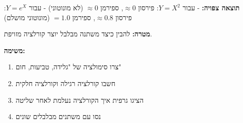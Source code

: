 \textbf{תוצאה צפויה:} 
- עבור $Y=X^2$: פירסון $\approx 0$, ספירמן $\approx 0$ (לא מונוטוני)
- עבור $Y=e^X$: פירסון $\approx 0.8$, ספירמן $= 1.0$ (מונוטוני מושלם)


\textbf{מטרה:} להבין כיצד משתנה מבלבל יוצר קורלציה מזויפת.

\textbf{משימה:}

\begin{enumerate}
\item צרו סימולציה של "גלידה, טביעות, חום"
\item חשבו קורלציה רגילה וקורלציה חלקית
\item הציגו גרפית איך הקורלציה נעלמת לאחר שליטה
\item נסו עם משתנים מבלבלים שונים
\end{enumerate}

